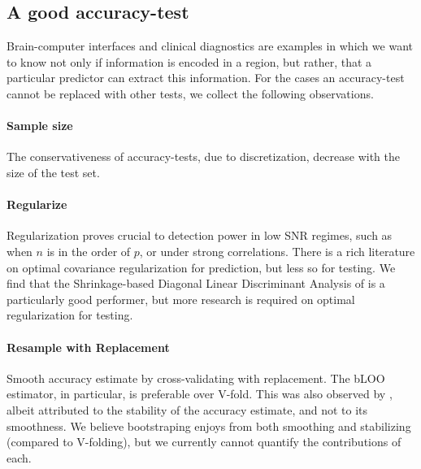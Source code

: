 \documentclass[]{bio}
\begin{document}
\subsection{A good accuracy-test}
Brain-computer interfaces and clinical diagnostics \citep{olivetti_induction_2012,wager_fmri-based_2013} are examples in which we want to know not only if information is encoded in a region, but rather, that a particular predictor can extract this information. 
For the cases an accuracy-test cannot be replaced with other tests, we collect the following observations.

\paragraph{Sample size} The conservativeness of accuracy-tests, due to discretization, decrease with the size of the test set. 

\paragraph{Regularize}
Regularization proves crucial to detection power in low SNR regimes, such as when $n$ is in the order of $p$, or under strong correlations.
There is a rich literature on optimal covariance regularization for prediction, but less so for testing.
We find that the Shrinkage-based Diagonal Linear Discriminant Analysis of \cite{pang_shrinkage-based_2009} is a particularly good performer, but more research is required on optimal regularization for testing. 


\paragraph{Resample with Replacement}
Smooth accuracy estimate by cross-validating with replacement. 
The bLOO estimator, in particular, is preferable over V-fold.
This was also observed by \cite{yu2007two}, albeit attributed to the stability of the accuracy estimate, and not to its smoothness. 
We believe bootstraping enjoys from both smoothing and stabilizing (compared to V-folding), but we currently cannot quantify the contributions of each. 
\end{document}
